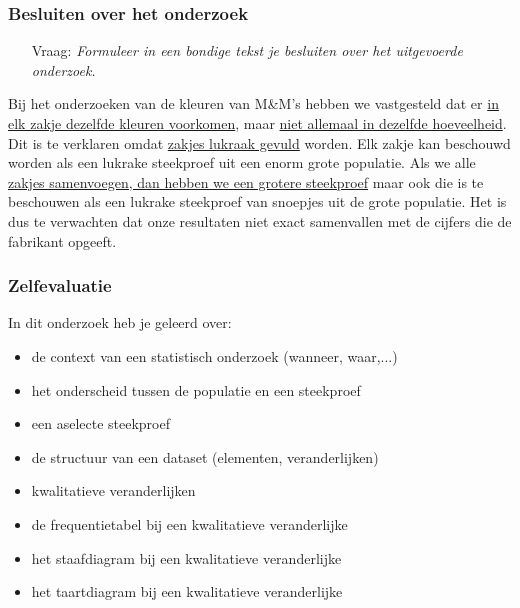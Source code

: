 \documentclass[dutch]{beamer}
\newcommand{\vraag}[1]{\begin{itemize}\item[Vraag:] {\it #1}\end{itemize}}
\begin{document}
\begin{frame}
\frametitle{Besluiten over het onderzoek}
\vraag{Formuleer in een bondige tekst je besluiten over het uitgevoerde onderzoek.}
\pause
Bij het onderzoeken van de kleuren van M\&M’s hebben we vastgesteld dat er \uline{in elk zakje
dezelfde kleuren voorkomen}, maar \uline{niet allemaal in dezelfde hoeveelheid}. Dit is te verklaren
omdat \uline{zakjes lukraak gevuld} worden. Elk zakje kan beschouwd worden als een lukrake
steekproef uit een enorm grote populatie. Als we alle \uline{zakjes samenvoegen, dan hebben we
een grotere steekproef} maar ook die is te beschouwen als een lukrake steekproef van snoepjes
uit de grote populatie. Het is dus te verwachten dat onze resultaten niet exact samenvallen
met de cijfers die de fabrikant opgeeft.
\end{frame}

\begin{frame}
\frametitle{Zelfevaluatie}
In dit onderzoek heb je geleerd over:\\
\begin{itemize}
  \item de context van een statistisch onderzoek (wanneer, waar,...)
  \item het onderscheid tussen de populatie en een steekproef
  \item een aselecte steekproef
  \item de structuur van een dataset (elementen, veranderlijken)
  \item kwalitatieve veranderlijken
  \item de frequentietabel bij een kwalitatieve veranderlijke
  \item het staafdiagram bij een kwalitatieve veranderlijke
  \item het taartdiagram bij een kwalitatieve veranderlijke
\end{itemize}
\end{frame}
\end{document}
